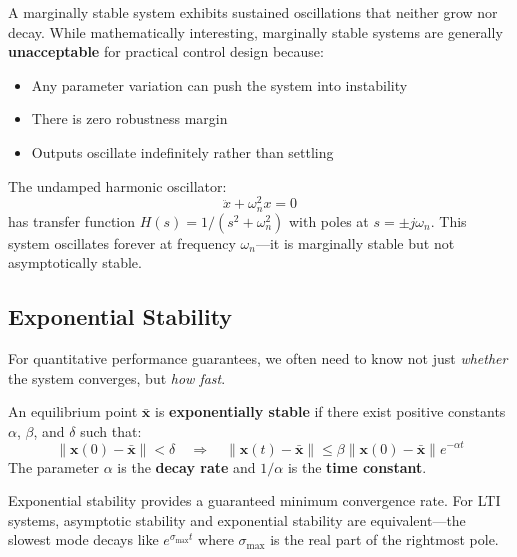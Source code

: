 A marginally stable system exhibits sustained oscillations that neither grow nor decay. While mathematically interesting, marginally stable systems are generally \textbf{unacceptable} for practical control design because:

\begin{itemize}
    \item Any parameter variation can push the system into instability
    \item There is zero robustness margin
    \item Outputs oscillate indefinitely rather than settling
\end{itemize}

\begin{example}
\label{ex:marginal}
The undamped harmonic oscillator:
\begin{equation}
\ddot{x} + \omega_n^2 x = 0
\end{equation}
has transfer function $H(s) = 1/(s^2 + \omega_n^2)$ with poles at $s = \pm j\omega_n$. This system oscillates forever at frequency $\omega_n$---it is marginally stable but not asymptotically stable.
\end{example}

\subsection{Exponential Stability}

For quantitative performance guarantees, we often need to know not just \textit{whether} the system converges, but \textit{how fast}.

\begin{definition}
\label{def:exponential_stability}
An equilibrium point $\bar{\mathbf{x}}$ is \textbf{exponentially stable} if there exist positive constants $\alpha$, $\beta$, and $\delta$ such that:
\begin{equation}
\|\mathbf{x}(0) - \bar{\mathbf{x}}\| < \delta \quad \Rightarrow \quad \|\mathbf{x}(t) - \bar{\mathbf{x}}\| \leq \beta \|\mathbf{x}(0) - \bar{\mathbf{x}}\| e^{-\alpha t}
\end{equation}
The parameter $\alpha$ is the \textbf{decay rate} and $1/\alpha$ is the \textbf{time constant}.
\end{definition}

Exponential stability provides a guaranteed minimum convergence rate. For LTI systems, asymptotic stability and exponential stability are equivalent---the slowest mode decays like $e^{\sigma_{\max} t}$ where $\sigma_{\max}$ is the real part of the rightmost pole.

